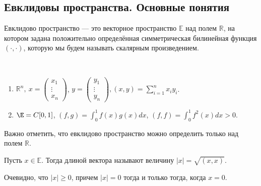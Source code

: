 \subsection*{Евклидовы пространства. Основные понятия}
\begin{Def}
	Евклидово пространство --- это векторное пространство $\mathbb{E}$ над полем $\mathbb{R}$, на котором задана положительно определённая симметрическая билинейная функция $(\cdot, \cdot)$, которую мы будем называть скалярным произведением.
\end{Def}
\begin{Examples}\
\begin{enumerate}
\item	$\mathbb{R}^n,\ x = \begin{pmatrix}x_1\\ \vdots\\ x_n\end{pmatrix}$, $y = \begin{pmatrix}y_1\\ \vdots\\ y_n\end{pmatrix}, 
		(x,y) = \sum\limits_{i = 1}^n x_iy_i$.
\item $\E = C[0, 1]$, $(f, g) = \int_{0}^{1}f(x)g(x)dx$, $(f, f) = \int_{0}^{1}f^2(x)dx > 0$.
\end{enumerate}
\end{Examples}
\begin{Comment}
	Важно отметить, что евклидово пространство можно определить только над полем $\mathbb{R}$.
\end{Comment}

\begin{Def}
	Пусть $x\in \mathbb{E}$. Тогда длиной вектора называют величину $|x| = \sqrt{(x,x)}$.
\end{Def}

Очевидно, что $|x| \geqslant 0$, причем $|x| = 0$ тогда и только тогда, когда $x = 0$.

